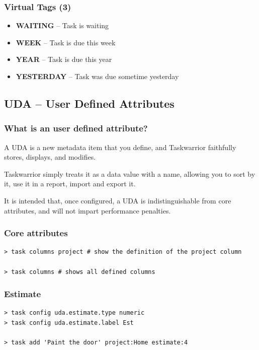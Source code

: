 \documentclass[t,handout,aspectratio=169]{beamer}
\begin{document}
\begin{frame}[fragile]\frametitle{Virtual Tags (3)}
    \vfill
    \begin{itemize}
        \item \textbf{WAITING}      -- Task is waiting
        \item \textbf{WEEK}         -- Task is due this week
        \item \textbf{YEAR}         -- Task is due this year
        \item \textbf{YESTERDAY}    -- Task was due sometime yesterday
    \end{itemize}
\end{frame}

\subsection{UDA -- User Defined Attributes}

\begin{frame}[fragile]\frametitle{What is an user defined attribute?}
    \vfill
    A UDA is a new metadata item that you define, and Taskwarrior faithfully stores, displays, and modifies. \pause

    Taskwarrior simply treats it as a data value with a name, allowing you to sort by it, use it in a report, import and export it. \pause

    It is intended that, once configured, a UDA is indistinguishable from core attributes, and will not impart performance penalties.
\end{frame}

\begin{frame}[fragile]\frametitle{Core attributes}
    \vfill
    \begin{lstlisting}
> task columns project # show the definition of the project column

> task columns # shows all defined columns\end{lstlisting}
\end{frame}

\begin{frame}[fragile]\frametitle{Estimate}
    \vfill
    \begin{lstlisting}
> task config uda.estimate.type numeric
> task config uda.estimate.label Est

> task add 'Paint the door' project:Home estimate:4\end{lstlisting}
\end{frame}
\end{document}
